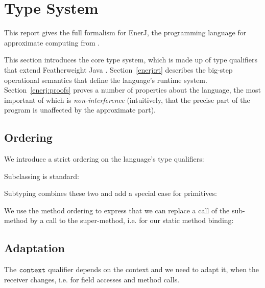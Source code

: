 \section{Type System}
\label{enerj:typesystem}

This report gives the full formalism for EnerJ, the programming language for
approximate computing from .

This section introduces the core type system, which is made up of type
qualifiers that extend Featherweight Java \cite{fjava}. Section~\ref{enerj:rt}
describes the big-step operational semantics that define the language's runtime
system. Section~\ref{enerj:proofs} proves a number of properties about the language,
the most important of which is \emph{non-interference} (intuitively, that the
precise part of the program is unaffected by the approximate part).


\subsection{Ordering}

We introduce a strict ordering on the language's type qualifiers:

\vspace{0.5ex}
\ottdefnqorder{}
\vspace{2.0ex}


Subclassing is standard:

\vspace{0.5ex}
\ottdefnsubclassing{}
\vspace{2.0ex}


Subtyping combines these two and add a special case for primitives:

\vspace{0.5ex}
\ottdefnsubtyping{}
\vspace{2.0ex}


We use the method ordering to express that we can replace a call of
the sub-method by a call to the super-method, i.e. for our static
method binding:

\vspace{0.5ex}
\ottdefnmethodsubtyping{}
\vspace{2.0ex}


\subsection{Adaptation}

The $ \texttt{\upshape{context}\,\!} $ qualifier depends on the context and we need to
adapt it, when the receiver changes, i.e. for field accesses and
method calls.

